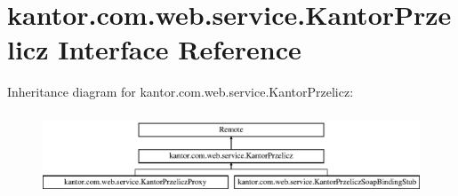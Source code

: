 \hypertarget{classkantor_1_1com_1_1web_1_1service_1_1_kantor_przelicz}{\section{kantor.\+com.\+web.\+service.\+Kantor\+Przelicz Interface Reference}
\label{classkantor_1_1com_1_1web_1_1service_1_1_kantor_przelicz}
}
Inheritance diagram for kantor.\+com.\+web.\+service.\+Kantor\+Przelicz\+:\begin{figure}[H]
\begin{center}
\leavevmode
\includegraphics[height=2.492581cm]{classkantor_1_1com_1_1web_1_1service_1_1_kantor_przelicz}
\end{center}
\end{figure}
